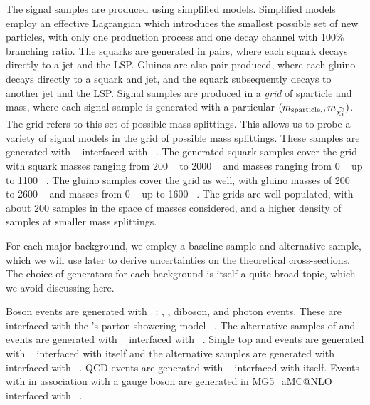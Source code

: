 The signal samples are produced using simplified models.
Simplified models employ an effective Lagrangian which introduces the smallest possible set of new particles, with only one production process and one decay channel with 100\% branching ratio.
The squarks are generated in pairs, where each squark decays directly to a jet and the LSP.
Gluinos are also pair produced, where each gluino decays directly to a squark and jet, and the squark subsequently decays to another jet and the LSP.
Signal samples are produced in a \textit{grid} of sparticle and \lsp~ mass, where each signal sample is generated with a particular $(m_{\text{sparticle}, }, m_{\tilde{\chi^0_1}})$.
The grid refers to this set of possible mass splittings.
This allows us to probe a variety of signal models in the grid of possible mass splittings.
These samples are generated with \madgraph ~\cite{madgraph1} interfaced with \PYTHIAEight ~\cite{Sjostrand:2014zea}.
The generated squark samples cover the grid with squark masses ranging from 200 \GeV~ to 2000 \GeV~ and \lsp masses ranging from 0 \GeV~ up to 1100 \GeV~.
The gluino samples cover the grid as well, with gluino masses of 200 \GeV~ to 2600 \GeV~ and \lsp masses from 0 \GeV~ up to 1600 \GeV~.
The grids are well-populated, with about 200 samples in the space of masses considered, and a higher density of samples at smaller mass splittings.


For each major background, we employ a baseline sample and alternative sample, which we will use later to derive uncertainties on the theoretical cross-sections.
The choice of generators for each background is itself a quite broad topic, which we avoid discussing here.

Boson events are generated with \sherpa~\cite{Gleisberg:2008ta}: \zjets, \wjets, diboson, and photon events.
These are interfaced with the \sherpa's parton showering model ~\cite{sherpashower}.
The alternative samples of \zjets and \wjets events are generated with \madgraph ~\cite{madgraph1} interfaced with \PYTHIAEight ~\cite{Sjostrand:2014zea}.
Single top and \ttbar events are generated with \powhegbox ~\cite{powheg-box} interfaced with itself and the alternative samples are generated with \mcatnlo ~\cite{Alwall:2014hca} interfaced with \HERWIGPP ~\cite{Frixione:2010ra}.
QCD events are generated with \PYTHIAEight ~\cite{Sjostrand:2014zea} interfaced with itself.
Events with \ttbar in association with a gauge boson are generated in MG5\_aMC@NLO ~\cite{Alwall:2014hca} interfaced with \PYTHIAEight ~\cite{Sjostrand:2014zea}.

